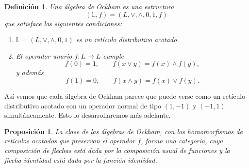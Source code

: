 \documentclass[12pt]{book}
\newtheorem{proposition}[theorem]{Proposición}
\newtheorem{definition}[theorem]{Definición}
\begin{document}
\begin{definition}
Una \emph{álgebra de Ockham} es una estructura
\[
  (\mathbb{L},f)=(L,\vee,\wedge,0,1,f)
\]
que satisface las siguientes condiciones:
\begin{enumerate}
  \item $\mathbb{L}=(L,\vee,\wedge,0,1)$ es un retículo distributivo acotado.
  \item El operador unario $f\colon L\to L$ cumple
  \[
    f(0)=1,\qquad f(x\vee y)=f(x)\wedge f(y),
  \]
  y además
  \[
    f(1)=0,\qquad f(x\wedge y)=f(x)\vee f(y).
  \]
\end{enumerate}
\end{definition}
Así vemos que cada álgebra de Ockham parece que puede verse como un retículo distributivo acotado con un operador normal de tipo $(1,-1)$ y $(-1,1)$ simultáneamente. Esto lo desarrollaremos más adelante.  

\begin{proposition}\label{CategoriaOckham}
La clase de las álgebras de Ockham, con los homomorfismos de retículos acotados que preservan el operador $f$, forma una categoría, cuya composición de flechas está dada por la composición usual de funciones y la flecha identidad está dada por la función identidad.
\end{proposition}
\end{document}
